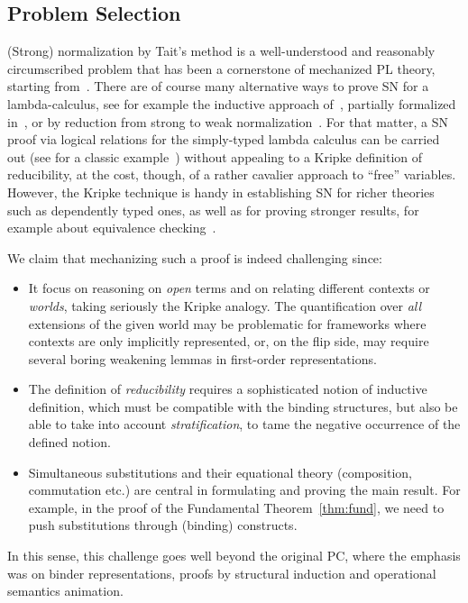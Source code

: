 
\subsection{Problem Selection}
\label{ssec:select}

(Strong) normalization by Tait's method is a well-understood and
reasonably circumscribed problem that has been a cornerstone of
mechanized PL theory, starting from~\citep{Altenkirch93}. There are of
course many alternative ways to prove SN for a lambda-calculus, see
for example the inductive approach of~\citep{Joachimski2003},
partially formalized in~\citep{ABEL20083}, or by reduction from strong
to weak normalization~\cite{SORENSEN199735}. For that matter, a SN
proof via logical relations for the simply-typed lambda calculus can
be carried out (see for a classic example~\citep{girardLafontTaylor})
{without} appealing to a Kripke definition of reducibility, at the
cost, though, of a rather cavalier approach to ``free''
variables. However, the Kripke technique is handy in establishing SN for richer
theories such as dependently typed ones, as well as for proving
stronger results, for example about equivalence
checking~\citep{Crary:ATAPL,Harper03tocl}.



We claim that mechanizing such a proof is
indeed challenging since:

\begin{itemize}
\item It focus on reasoning on \emph{open} terms and on relating
  different contexts or \emph{worlds}, taking seriously the Kripke
  analogy. The quantification over \emph{all} extensions of the given
  world may be problematic for frameworks where contexts are only
  implicitly represented, or, on the flip side, may require several
  boring weakening lemmas in first-order representations.
\item The definition of \emph{reducibility} requires a sophisticated
  notion of inductive definition, which must be compatible with the
  binding structures, but also be able to take into account
  \emph{stratification}, to tame the negative occurrence of the
  defined notion.
\item Simultaneous substitutions and their equational theory
  (composition, commutation etc.) are central in formulating and
  proving the main result. For example, in the proof of the Fundamental
  Theorem~\ref{thm:fund}, we need to push substitutions through
  (binding) constructs.
\end{itemize}
%
In this sense, this challenge goes well beyond the original PC, where
the emphasis was on binder representations, proofs by structural
induction and operational semantics animation.


